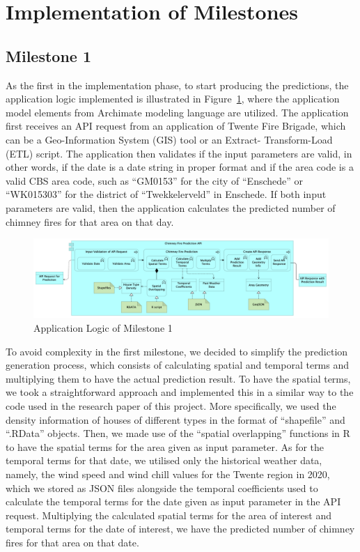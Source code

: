 \documentclass{utitcphd_overleaf}
\begin{document}


\section{Implementation of Milestones}

\subsection{Milestone 1}

As the first in the implementation phase, to start producing the predictions, the application logic implemented is illustrated in Figure~\ref{fig:m1_logic}, where the application model elements from Archimate modeling language are utilized. The application first receives an API request from an application of Twente Fire Brigade, which can be a Geo-Information System (GIS) tool or an Extract- Transform-Load (ETL) script. The application then validates if the input parameters are valid, in other words, if the date is a date string in proper format and if the area code is a valid CBS area code, such as “GM0153” for the city of “Enschede” or “WK015303” for the district of “Twekkelerveld” in Enschede. If both input parameters are valid, then the application calculates the predicted number of chimney fires for that area on that day.

\begin{figure}[ht]
  \centering
  \includegraphics[width=1\textwidth]{my_images/milestones/m1.png}
  \caption{Application Logic of Milestone 1}
  \label{fig:m1_logic}
\end{figure}

To avoid complexity in the first milestone, we decided to simplify the prediction generation process, which consists of calculating spatial and temporal terms and multiplying them to have the actual prediction result. To have the spatial terms, we took a straightforward approach and implemented this in a similar way to the code used in the research paper of this project. More specifically, we used the density information of houses of different types in the format of “shapefile” and “.RData” objects. Then, we made use of the “spatial overlapping” functions in R to have the spatial terms for the area given as input parameter. As for the temporal terms for that date, we utilised only the historical weather data, namely, the wind speed and wind chill values for the Twente region in 2020, which we stored as JSON files alongside the temporal coefficients used to calculate the temporal terms for the date given as input parameter in the API request. Multiplying the calculated spatial terms for the area of interest and temporal terms for the date of interest, we have the predicted number of chimney fires for that area on that date.
\end{document}
